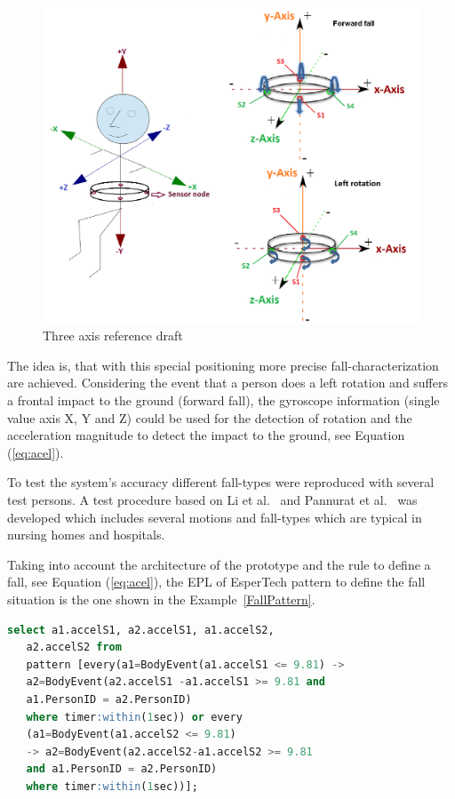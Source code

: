 \documentclass[conference]{IEEEtran}
\theoremstyle{definition}
\begin{document}
\begin{figure}[!h]
  \centering
  \includegraphics[scale=0.24]{./img/axis}
  \caption[Three axis reference draft]{Three axis reference draft \cite{LaBlunda.2016b,LuigiMasterThesis}}
  \label{fig:axisreference}
\end{figure}

The idea is, that with this special positioning more precise fall-characterization are achieved. Considering 
the event that a person does a left rotation and suffers a frontal impact to the ground (forward fall), 
the gyroscope information (single value axis X, Y and Z) could be used for the detection of rotation and the 
acceleration magnitude to detect the impact to the ground, see Equation (\ref{eq:acel}).

To test the system's accuracy different fall-types were reproduced with several test persons. A 
test procedure based on Li et al.~\cite{Li2009} and Pannurat et al.~\cite{Pannurat2014} was developed which includes 
several motions and fall-types which are typical in nursing homes and hospitals.

Taking into account the architecture of the prototype and the rule to define a fall, see Equation (\ref{eq:acel}), 
the EPL of EsperTech pattern to define the fall situation is the one shown in the Example~\ref{FallPattern}.

\begin{lstlisting}[basicstyle=\ttfamily\footnotesize,language=SQL,caption=Fall pattern,label=FallPattern]
  select a1.accelS1, a2.accelS1, a1.accelS2, 
   a2.accelS2 from 
   pattern [every(a1=BodyEvent(a1.accelS1 <= 9.81) -> 
   a2=BodyEvent(a2.accelS1 -a1.accelS1 >= 9.81 and 
   a1.PersonID = a2.PersonID) 
   where timer:within(1sec)) or every 
   (a1=BodyEvent(a1.accelS2 <= 9.81)
   -> a2=BodyEvent(a2.accelS2-a1.accelS2 >= 9.81
   and a1.PersonID = a2.PersonID) 
   where timer:within(1sec))];
 \end{lstlisting}
\end{document}
